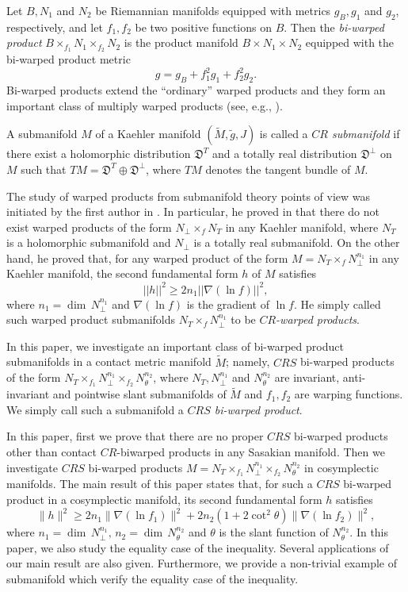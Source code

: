 \documentclass[reqno]{amsart}
\theoremstyle{plain}
\theoremstyle{remark}
\numberwithin{equation}{section}
\begin{document}
Let $B,N_{1}$ and $N_{2}$ be Riemannian manifolds equipped with metrics $g_B,g_1$ and $g_{2}$, respectively, and let $f_{1},f_{2}$ be two positive functions on $B$. Then the {\it bi-warped product} $B\times_{f_{1}} N_{1}\times_{f_{2}} N_{2}$ is the product manifold $B\times N_{1}\times N_{2}$ equipped with the bi-warped product metric
\begin{equation}\label{E:warped} g=g_B+f_{1}^2 g_1+f_{2}^2 g_2.\end{equation}
Bi-warped products extend the ``ordinary'' warped products and they form  
an important class of multiply warped products (see, e.g., \cite{Awatif19,C6,CD,SC1,SC,Unal}).

A submanifold $M$ of a Kaehler manifold $(\widetilde M, \widetilde g,J)$ is called a {\it $CR$ submanifold}  \cite{bejancu} if there exist a holomorphic distribution $\mathfrak D^{T}$ and a totally real distribution $\mathfrak D^\perp$ on $M$ such that $TM=\mathfrak D^{T}\oplus \mathfrak D^\perp$, where $TM$ denotes the tangent bundle of $M$. 

The study of warped products from submanifold theory points of view was initiated by
the first author in \cite{C3,C4,C02,C03,C04}. In particular, he proved in \cite{C3} that there do not exist warped products of the form $N_{\perp}\times_{f} N_{T}$ in any Kaehler manifold, where $N_{T}$ is a holomorphic submanifold and $N_{\perp}$ is a totally real submanifold. On the other hand, he proved that, for any  warped product of the form $M=N_{T}\times_f N^{n_{1}}_{\perp}$ in any Kaehler manifold,  the second fundamental form $h$ of $M$ satisfies
$$||h||^2\geq 2n_1 ||\nabla(\ln f)||^2,$$ where $n_{1}=\dim\,N^{n_{1}}_{\perp}$ and $\nabla (\ln f)$ is the gradient of $\ln f$. He simply  called such warped product submanifolds $N_{T}\times_f N^{n_{1}}_{\perp}$ to be {\it $CR$-warped products}.

In this paper, we investigate an important class of bi-warped product submanifolds in a contact metric manifold $\widetilde M$; namely, $CRS$ bi-warped products of the form $N_T\times_{f_1}N^{n_{1}}_\perp\times_{f_2}N^{n_{2}}_\theta$, where $N_T, N^{n_{1}}_\perp$ and $N^{n_{2}}_\theta$ are invariant, anti-invariant and pointwise slant submanifolds of $\widetilde M$ and $f_{1},f_{2}$ are warping functions.
 We simply call such a submanifold a {\it $CRS$ bi-warped product}. 

In this paper, first we prove that there are no proper $CRS$ bi-warped products other than contact $CR$-biwarped products in any Sasakian manifold. Then we investigate $CRS$ bi-warped products $M=N_T\times_{f_1}N^{n_{1}}_\perp\times_{f_2}N^{n_{2}}_\theta$ in cosymplectic manifolds. The main result of this paper states that, for such a $CRS$ bi-warped product in a cosymplectic manifold, its second fundamental form $h$ satisfies
 $$\|h\|^2\geq 2n_1\|\nabla(\ln f_1)\|^2+2n_2(1+2\cot^2\theta)\|\nabla(\ln f_2)\|^2,$$
where $n_1=\dim\,N^{n_{1}}_\perp,\,n_2=\dim\, N^{n_{2}}_\theta$ and $\theta$ is the slant function of $N^{n_{2}}_\theta$.
In this paper, we also study the equality case of the inequality. Several applications of our main result are also given. Furthermore, we provide a non-trivial example of submanifold which verify the equality case of the inequality.
 
\end{document}
